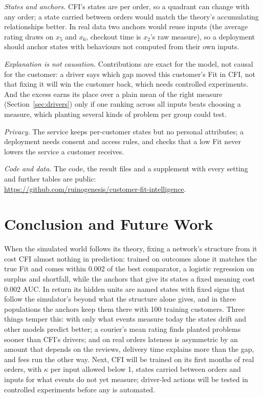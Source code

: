 \documentclass[10pt,twocolumn,letterpaper]{article}
\newcommand{\secref}[1]{Section~\mbox{\ref{#1}}}
\newcommand{\runin}[1]{\textit{#1}\hspace{0.4em}}
\begin{document}
\runin{States and anchors.} CFI's states are per order, so a quadrant can change with any order; a state carried between orders would match the theory's accumulating relationships better. In real data two anchors would reuse inputs (the average rating draws on $x_5$ and $x_6$, checkout time is $x_2$'s raw measure), so a deployment should anchor states with behaviours not computed from their own inputs.

\runin{Explanation is not causation.} Contributions are exact for the model, not causal for the customer: a driver says which gap moved this customer's Fit in CFI, not that fixing it will win the customer back, which needs controlled experiments. And the excess earns its place over a plain mean of the right measure (\secref{sec:drivers}) only if one ranking across all inputs beats choosing a measure, which planting several kinds of problem per group could test.

\runin{Privacy.} The service keeps per-customer states but no personal attributes; a deployment needs consent and access rules, and checks that a low Fit never lowers the service a customer receives.

\runin{Code and data.} The code, the result files and a supplement with every setting and further tables are public:\\{\footnotesize\url{https://github.com/ruinogenesis/customer-fit-intelligence}}.

\section{Conclusion and Future Work}\label{sec:conclusion}

When the simulated world follows its theory, fixing a network's structure from it cost CFI almost nothing in prediction: trained on outcomes alone it matches the true Fit and comes within 0.002 of the best comparator, a logistic regression on surplus and shortfall, while the anchors that give its states a fixed meaning cost 0.002 AUC. In return its hidden units are named states with fixed signs that follow the simulator's beyond what the structure alone gives, and in three populations the anchors keep them there with 100 training customers. Three things temper this: with only what events measure today the states drift and other models predict better; a courier's mean rating finds planted problems sooner than CFI's drivers; and on real orders lateness is asymmetric by an amount that depends on the reviews, delivery time explains more than the gap, and fees run the other way. Next, CFI will be trained on its first months of real orders, with $\kappa$ per input allowed below 1, states carried between orders and inputs for what events do not yet measure; driver-led actions will be tested in controlled experiments before any is automated.
\end{document}
